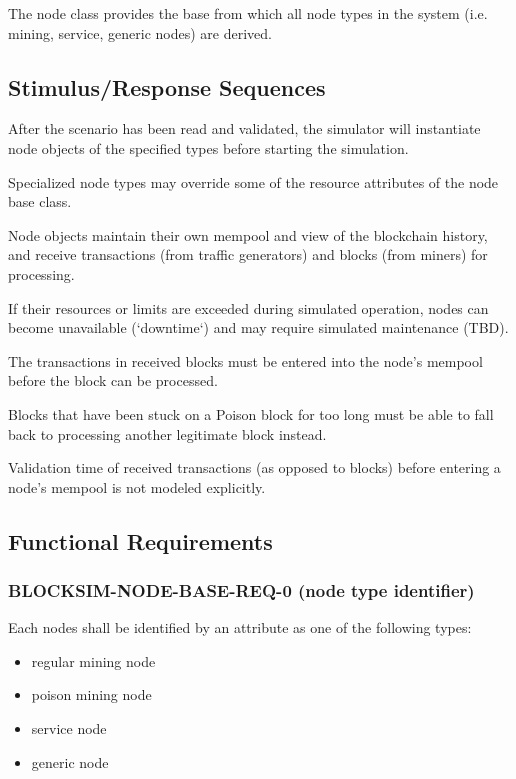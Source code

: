 \documentclass{scrreprt}
\begin{document}
The node class provides the base from which all node types in the
system (i.e. mining, service, generic nodes) are derived.


\subsection{Stimulus/Response Sequences}

After the scenario has been read and validated, the simulator will
instantiate node objects of the specified types before starting the
simulation.

Specialized node types may override some of the resource attributes
of the node base class.

Node objects maintain their own mempool and view of the blockchain history,
and receive transactions (from traffic generators) and blocks (from miners)
for processing.

If their resources or limits are exceeded during simulated operation, nodes
can become unavailable (`downtime`) and may require simulated maintenance (TBD).

The transactions in received blocks must be entered into the node's mempool
before the block can be processed.

Blocks that have been stuck on a Poison block for too long must be able to
fall back to processing another legitimate block instead.

Validation time of received transactions (as opposed to blocks) before
entering a node's mempool is not modeled explicitly.

\subsection{Functional Requirements}

\subsubsection{BLOCKSIM-NODE-BASE-REQ-0 (node type identifier)}

Each nodes shall be identified by an attribute as one of the following types:

\begin{itemize}
   \item regular mining node
   \item poison mining node
   \item service node
   \item generic node
\end{itemize}
\end{document}
